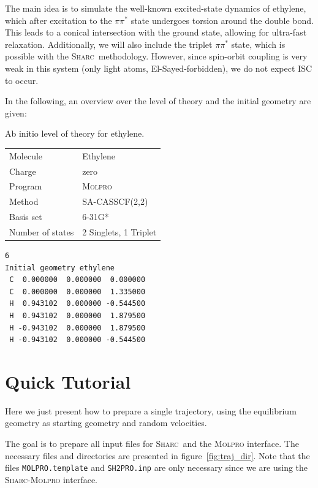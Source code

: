 \documentclass[a4paper,11pt,DIV=15,openany]{scrbook}
\newcommand{\sharc}{\textsc{Sharc}}
\newcommand{\ttt}[1]{\texttt{#1}}
\begin{document}
The main idea is to simulate the well-known excited-state dynamics of ethylene, which after excitation to the $\pi\pi^*$ state undergoes torsion around the double bond. This leads to a conical intersection with the ground state, allowing for ultra-fast relaxation. Additionally, we will also include the triplet $\pi\pi^*$ state, which is possible with the \sharc\ methodology. However, since spin-orbit coupling is very weak in this system (only light atoms, El-Sayed-forbidden), we do not expect ISC to occur. 

In the following, an overview over the level of theory and the initial geometry are given:

\begin{shaded}
\begin{minipage}{0.45\textwidth}
  \centering
  Ab initio level of theory for ethylene.
  \begin{tabular}{ll}
    \toprule
    Molecule            &Ethylene\\
    Charge              &zero\\
    Program             &\textsc{Molpro}\\
    Method              &SA-CASSCF(2,2)\\
    Basis set           &6-31G*\\
    Number of states    &2 Singlets, 1 Triplet\\
    \bottomrule
  \end{tabular}
\end{minipage}
\hfill
\begin{minipage}{0.45\textwidth}
  \begin{verbatim}
6
Initial geometry ethylene
 C  0.000000  0.000000  0.000000
 C  0.000000  0.000000  1.335000
 H  0.943102  0.000000 -0.544500
 H  0.943102  0.000000  1.879500
 H -0.943102  0.000000  1.879500
 H -0.943102  0.000000 -0.544500
  \end{verbatim}
\end{minipage}
\end{shaded}


\chapter{Quick Tutorial}

Here we just present how to prepare a single trajectory, using the equilibrium geometry as starting geometry and random velocities. 

The goal is to prepare all input files for \sharc\ and the \textsc{Molpro} interface. The necessary files and directories are presented in figure~\ref{fig:traj_dir}. Note that the files \ttt{MOLPRO.template} and \ttt{SH2PRO.inp} are only necessary since we are using the \sharc-\textsc{Molpro} interface.
\end{document}
